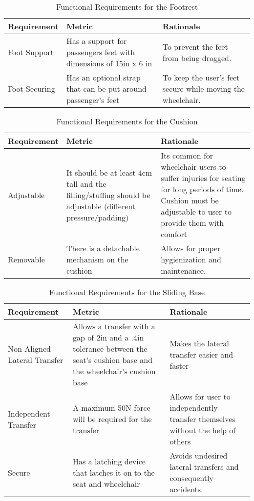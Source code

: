 \begin{table}
\begin{tabular} {| p{4cm} | p{5cm} | p{5cm} |}
\hline
\textbf{Requirement} & \textbf{Metric} & \textbf{Rationale} \\ \hline

Foot Support &  Has a support for passengers feet with dimensions of 15in x 6 in & To prevent the feet from being dragged. \\ \hline
Foot Securing & Has an optional strap that can be put around passenger's feet & To keep the user's feet secure while moving the wheelchair.  \\ \hline
\end{tabular} 
\caption{Functional Requirements for the Footrest}
\label{tab:functional_requirements_footrest}
\end{table}


\clearpage
\newpage


\begin{table}
\begin{tabular} {| p{4cm} | p{5cm} | p{5cm} |}
\hline
\textbf{Requirement} & \textbf{Metric} & \textbf{Rationale} \\ \hline

Adjustable & It should be at least 4cm tall and the filling/stuffing should be adjustable (different pressure/padding)& Its common for wheelchair users to suffer injuries for seating for long periods of time. Cushion must be adjustable to user to provide them with comfort \\ \hline
Removable & There is a detachable mechanism on the cushion& Allows for proper hygienization and maintenance. \\ \hline
\end{tabular} 
\caption{Functional Requirements for the Cushion}
\label{tab:functional_requirements_cushion}
\end{table}


\begin{table}
\begin{tabular} {| p{4cm} | p{5cm} | p{5cm} |}
\hline
\textbf{Requirement} & \textbf{Metric} & \textbf{Rationale} \\ \hline
Non-Aligned Lateral Transfer & Allows a transfer with a gap of 2in and a .4in tolerance between the seat's cushion base and the wheelchair's cushion base & Makes the lateral transfer easier and faster  \\ \hline
Independent Transfer & A maximum 50N force will be required for the transfer & Allows for user to independently transfer themselves without the help of others  \\ \hline
Secure & Has a latching device that latches it on to the seat and wheelchair & Avoids undesired lateral transfers and consequently accidents. \\ \hline
\end{tabular} 
\caption{Functional Requirements for the Sliding Base}
\label{tab:functional_requirements_sliding}
\end{table}

